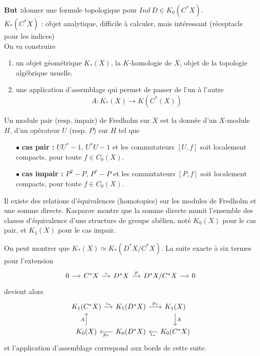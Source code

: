\documentclass{beamer}
\begin{document}
\begin{frame}
\textbf{But :}donner une formule topologique pour $Ind\ D\in K_0(C^*X)$.\\

$K_*(C^*X)$ : objet analytique, difficile à calculer, mais intéressant (réceptacle pour les indices)\\

On va construire 
\begin{enumerate}
\item un objet géométrique $K_*(X)$, la $K$-homologie de $X$, objet de la topologie algébrique usuelle. 
\item une application d'assemblage qui permet de passer de l'un à l'autre
\[A : K_*(X)\rightarrow K(C^*(X))\]
\end{enumerate} 
 
\end{frame}

\begin{frame}
\begin{definition}
Un module pair (resp. impair) de Fredholm sur $X$ est la donnée d'un $X$-module $H$, d'un opérateur $U$ (resp. $P$) sur $H$ tel que
\begin{itemize}
\item[$\bullet$] \textbf{cas pair :} $UU^*-1$, $U^*U-1$ et les commutateurs $[U,f]$ soit localement compacts, pour toute $f\in C_0(X)$.
\item[$\bullet$] \textbf{cas impair :} $P^2-P$, $P^*-P$ et les commutateurs $[P,f]$ soit localement compacts, pour toute $f\in C_0(X)$.
\end{itemize}
Il existe des relations d'équivalences (homotopies) sur les modules de Fredholm et une somme directe. Kasparov montre que la somme directe munit l'ensemble des classes d'équivalence d'une structure de groupe abélien, noté $K_0(X)$ pour le cas pair, et $K_1(X)$ pour le cas impair. 
\end{definition}
\end{frame}

\begin{frame}
On peut montrer que $K_*(X)\simeq K_*(D^*X/C^*X)$. La suite exacte à six termes pour l'extension 
\[\begin{tikzcd}[ampersand replacement=\&,column sep = small]
0 \arrow{r} \& C^*X \arrow{r}{\iota} \& D^*X\arrow{r}{p} \& D^*X/C^*X\arrow{r} \& 0  
\end{tikzcd}\]
devient alors
\[\begin{tikzcd}[ampersand replacement=\&,column sep = small]
 K_1(C^*X)\arrow{r}{\iota_*}\& K_1(D^*X)\arrow{r}{p_*}\& K_1(X)\arrow{d}{A}\\
K_0(X)\arrow{u}{A}\& K_0(D^*X)\arrow{l}{p_*}\& K_0(C^*X)\arrow{l}{\iota_*}
\end{tikzcd}\]
et l'application d'assemblage correspond aux bords de cette suite.
\end{frame}
\end{document}

